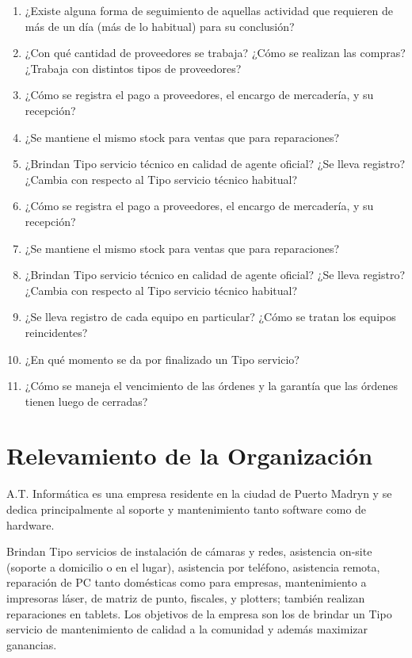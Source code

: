 \documentclass[12pt]{extarticle}
\begin{document}
\begin{spacing}{1.2}
\begin{enumerate}
        \item ¿Existe alguna forma de seguimiento de aquellas actividad que requieren de más de un día (más de lo habitual) para su conclusión?
        \item ¿Con qué cantidad de proveedores se trabaja? ¿Cómo se realizan las compras? ¿Trabaja con distintos tipos de proveedores?
        \item ¿Cómo se registra el pago a proveedores, el encargo de mercadería, y su recepción?
        \item ¿Se mantiene el mismo stock para ventas que para reparaciones?
        \item ¿Brindan Tipo servicio técnico en calidad de agente oficial? ¿Se lleva registro? ¿Cambia con respecto al Tipo servicio técnico habitual?
        \item ¿Cómo se registra el pago a proveedores, el encargo de mercadería, y su recepción?
        \item ¿Se mantiene el mismo stock para ventas que para reparaciones?
        \item ¿Brindan Tipo servicio técnico en calidad de agente oficial? ¿Se lleva registro? ¿Cambia con respecto al Tipo servicio técnico habitual?
        \item ¿Se lleva registro de cada equipo en particular? ¿Cómo se tratan los equipos reincidentes?
        \item ¿En qué momento se da por finalizado un Tipo servicio?
        \item ¿Cómo se maneja el vencimiento de las órdenes y la garantía que las órdenes tienen luego de cerradas?
    \end{enumerate}

    \pagebreak









    \section{Relevamiento de la Organización}
    A.T. Informática es una empresa residente en la ciudad de Puerto Madryn y se dedica principalmente al soporte y mantenimiento tanto software como de hardware.

    Brindan Tipo servicios de instalación de cámaras y redes, asistencia on-site (soporte a domicilio o en el lugar), asistencia por teléfono, asistencia remota, reparación de PC tanto domésticas como para empresas, mantenimiento a impresoras láser, de matriz de punto, fiscales, y plotters; también realizan reparaciones en tablets.  Los objetivos de la empresa son los de brindar un Tipo servicio de mantenimiento de calidad a la comunidad y además maximizar ganancias.\\


\end{spacing}
\end{document}
